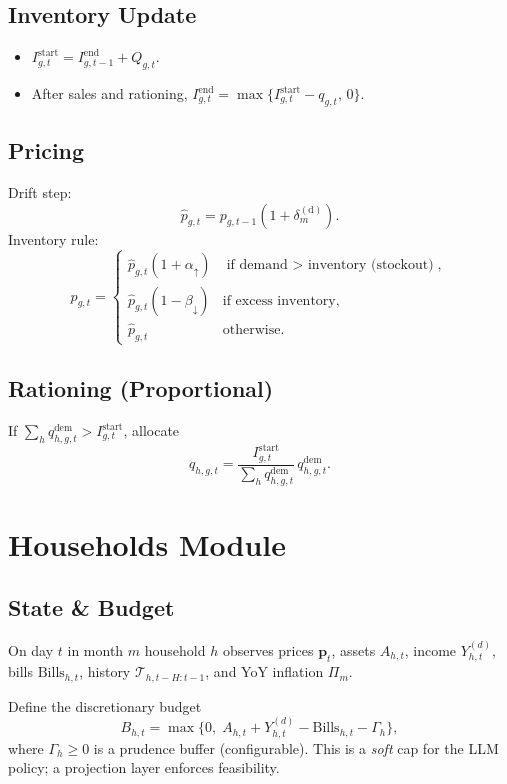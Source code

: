 \documentclass[12pt]{article}
\begin{document}
\subsection*{Inventory Update}
\begin{itemize}
  \item $I^{\mathrm{start}}_{g,t}=I^{\mathrm{end}}_{g,t-1}+Q_{g,t}$.
  \item After sales and rationing, $I^{\mathrm{end}}_{g,t}=\max\{I^{\mathrm{start}}_{g,t}-q_{g,t},\,0\}$.
\end{itemize}

\subsection*{Pricing}
Drift step:
$$
\hat{p}_{g,t}=p_{g,t-1}\left(1+\delta_m^{(\mathrm{d})}\right).
$$
Inventory rule:
$$
p_{g,t}=
\begin{cases}
\hat{p}_{g,t}(1+\alpha_{\uparrow})& \text{if demand $>$ inventory (stockout)},\\[4pt]
\hat{p}_{g,t}(1-\beta_{\downarrow})& \text{if excess inventory},\\[4pt]
\hat{p}_{g,t}& \text{otherwise.}
\end{cases}
$$

\subsection*{Rationing (Proportional)}
If $\sum_h q^{\mathrm{dem}}_{h,g,t}>I^{\mathrm{start}}_{g,t}$, allocate
$$
q_{h,g,t}=\frac{I^{\mathrm{start}}_{g,t}}{\sum_h q^{\mathrm{dem}}_{h,g,t}}\,q^{\mathrm{dem}}_{h,g,t}.
$$

\section{Households Module}
\subsection*{State \& Budget}
On day $t$ in month $m$ household $h$ observes prices $\mathbf{p}_t$, assets $A_{h,t}$, income $Y_{h,t}^{(d)}$, bills $\mathrm{Bills}_{h,t}$, history $\mathcal{T}_{h,t-H:t-1}$, and YoY inflation $\Pi_m$.

Define the discretionary budget
$$
B_{h,t}=\max\Big\{0,\; A_{h,t}+Y_{h,t}^{(d)}-\mathrm{Bills}_{h,t}-\Gamma_h\Big\},
$$
where $\Gamma_h\ge 0$ is a prudence buffer (configurable). This is a \emph{soft} cap for the LLM policy; a projection layer enforces feasibility.
\end{document}
